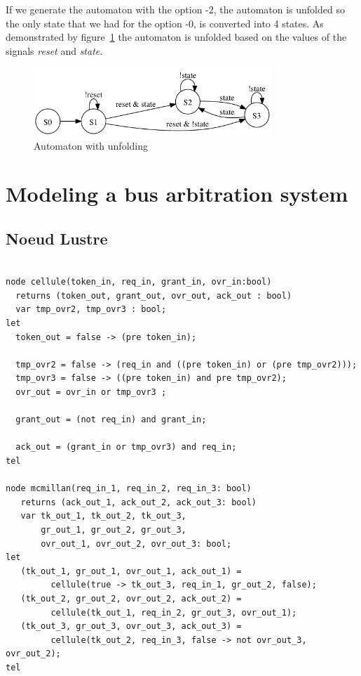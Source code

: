 \documentclass{article}
\begin{document}
If we generate the automaton with the option -2, the automaton
is unfolded so the only state that we had for the option -0, is
converted into 4 states. As demonstrated by figure~\ref{automaton-2}
the automaton is unfolded based on the values of the signals \emph{reset}
and \emph{state}.

\begin{figure}[!ht]
\label{automaton-2}
\caption{Automaton with unfolding}
\begin{center}
\includegraphics[width=0.8\textwidth, natwidth=610,natheight=642]{automaton-2.png}
\end{center}
\end{figure}

\section{Modeling a bus arbitration system}

\subsection{Noeud Lustre}

\begin{verbatim}

node cellule(token_in, req_in, grant_in, ovr_in:bool) 
  returns (token_out, grant_out, ovr_out, ack_out : bool)
  var tmp_ovr2, tmp_ovr3 : bool;
let
  token_out = false -> (pre token_in);

  tmp_ovr2 = false -> (req_in and ((pre token_in) or (pre tmp_ovr2)));
  tmp_ovr3 = false -> ((pre token_in) and pre tmp_ovr2);
  ovr_out = ovr_in or tmp_ovr3 ;

  grant_out = (not req_in) and grant_in;

  ack_out = (grant_in or tmp_ovr3) and req_in;
tel

node mcmillan(req_in_1, req_in_2, req_in_3: bool)
   returns (ack_out_1, ack_out_2, ack_out_3: bool)
   var tk_out_1, tk_out_2, tk_out_3,
       gr_out_1, gr_out_2, gr_out_3,
       ovr_out_1, ovr_out_2, ovr_out_3: bool;
let
   (tk_out_1, gr_out_1, ovr_out_1, ack_out_1) = 
         cellule(true -> tk_out_3, req_in_1, gr_out_2, false);
   (tk_out_2, gr_out_2, ovr_out_2, ack_out_2) = 
         cellule(tk_out_1, req_in_2, gr_out_3, ovr_out_1);
   (tk_out_3, gr_out_3, ovr_out_3, ack_out_3) = 
         cellule(tk_out_2, req_in_3, false -> not ovr_out_3, ovr_out_2);
tel
\end{verbatim}
\end{document}
